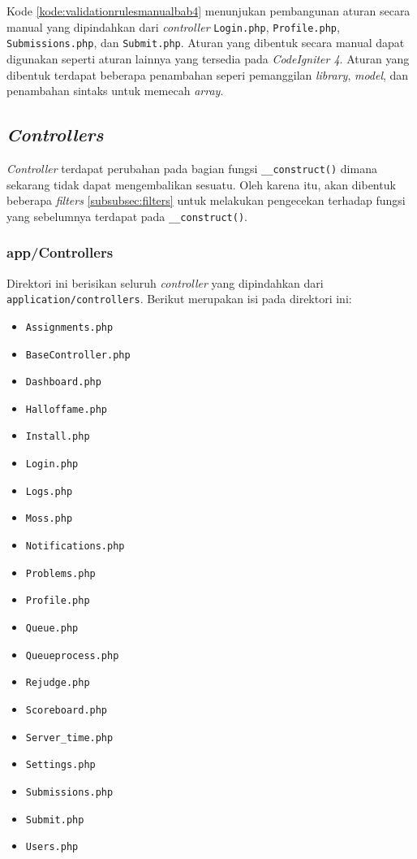 Kode \ref{kode:validationrulesmanualbab4} menunjukan pembangunan aturan secara manual yang dipindahkan dari \textit{controller} \texttt{Login.php}, \texttt{Profile.php}, \texttt{Submissions.php}, dan \texttt{Submit.php}. Aturan yang dibentuk secara manual dapat digunakan seperti aturan lainnya yang tersedia pada \textit{CodeIgniter 4}. Aturan yang dibentuk terdapat beberapa penambahan seperi pemanggilan \textit{library}, \textit{model}, dan penambahan sintaks untuk memecah \textit{array}.

\subsection{\textit{Controllers}}
\textit{Controller} terdapat perubahan pada bagian fungsi \texttt{\_\_construct()} dimana sekarang tidak dapat mengembalikan sesuatu. Oleh karena itu, akan dibentuk beberapa \textit{filters} \ref{subsubsec:filters} untuk melakukan pengecekan terhadap fungsi yang sebelumnya terdapat pada \texttt{\_\_construct()}.
	\subsubsection{app/Controllers} 
	Direktori ini berisikan seluruh \textit{controller} yang dipindahkan dari \texttt{application/controllers}. Berikut merupakan isi pada direktori ini:
	\begin{itemize}
		\item \texttt{Assignments.php}
		\item \texttt{BaseController.php}
		\item \texttt{Dashboard.php}
		\item \texttt{Halloffame.php}
		\item \texttt{Install.php}
		\item \texttt{Login.php}
		\item \texttt{Logs.php}
		\item \texttt{Moss.php}
		\item \texttt{Notifications.php}
		\item \texttt{Problems.php}
		\item \texttt{Profile.php}
		\item \texttt{Queue.php}
		\item \texttt{Queueprocess.php}
		\item \texttt{Rejudge.php}
		\item \texttt{Scoreboard.php}
		\item \texttt{Server\_time.php}
		\item \texttt{Settings.php}
		\item \texttt{Submissions.php}
		\item \texttt{Submit.php}
		\item \texttt{Users.php}
	\end{itemize}

